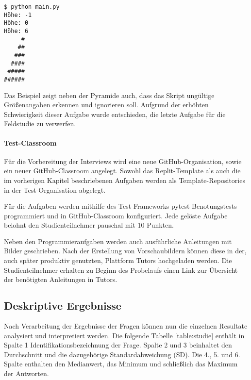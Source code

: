 \begin{lstlisting}[style=Bash]
$ python main.py
Höhe: -1
Höhe: 0
Höhe: 6
     #
    ##
   ###
  ####
 #####
######
\end{lstlisting}

Das Beispiel zeigt neben der Pyramide auch, dass das Skript ungültige
Größenangaben erkennen und ignorieren soll. Aufgrund der erhöhten Schwierigkeit
dieser Aufgabe wurde entschieden, die letzte Aufgabe für die Feldstudie zu
verwerfen.

\paragraph{Test-Classroom}
Für die Vorbereitung der Interviews wird eine neue GitHub-Organisation, sowie
ein neuer GitHub-Classroom angelegt. Sowohl das Replit-Template als auch die im
vorherigen Kapitel beschriebenen Aufgaben werden als Template-Repositories in
der Test-Organisation abgelegt.

Für die Aufgaben werden mithilfe des Test-Frameworks pytest Benotungstests
programmiert und in GitHub-Classroom konfiguriert. Jede gelöste Aufgabe belohnt
den Studienteilnehmer pauschal mit 10 Punkten.

Neben den Programmieraufgaben werden auch ausführliche Anleitungen mit Bilder
geschrieben. Nach der Erstellung von Vorschaubildern können diese in der,
auch später produktiv genutzten, Plattform Tutors hochgeladen werden. Die
Studienteilnehmer erhalten zu Beginn des Probelaufs einen Link zur Übersicht der benötigten Anleitungen in Tutors.

\newpage
\subsection{Deskriptive Ergebnisse}
Nach Verarbeitung der Ergebnisse der Fragen können nun die einzelnen Resultate
analysiert und interpretiert werden. Die folgende Tabelle \ref{table:studie}
enthält in Spalte 1 Identifikationsbezeichnung der Frage. Spalte 2 und 3
beinhaltet den Durchschnitt und die dazugehörige Standardabweichung (SD).
Die 4., 5. und 6. Spalte enthalten den Medianwert, das Minimum und 
schließlich das Maximum der Antworten.

